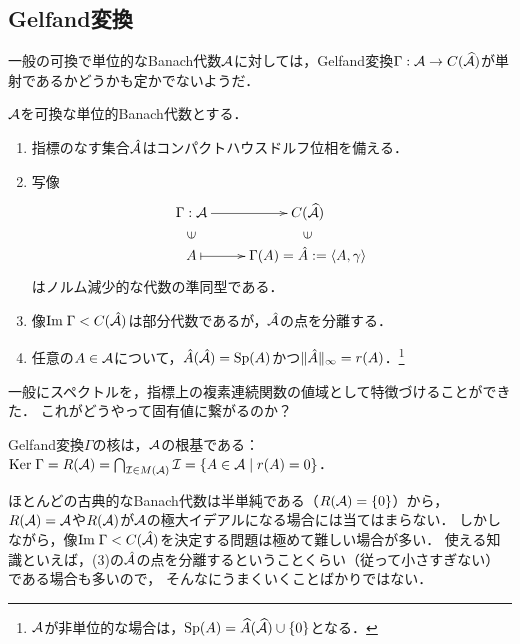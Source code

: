 \documentclass[uplatex,dvipdfmx]{jsreport}
\begin{document}
\subsection{Gelfand変換}

\begin{tcolorbox}[colframe=ForestGreen, colback=ForestGreen!10!white,breakable,colbacktitle=ForestGreen!40!white,coltitle=black,fonttitle=\bfseries\sffamily,
title=]
    一般の可換で単位的なBanach代数$\mathcal{A}$に対しては，Gelfand変換$\Gamma:\mathcal{A}\to C(\widehat{\mathcal{A}})$が単射であるかどうかも定かでないようだ．
\end{tcolorbox}

\begin{theorem}\label{thm-Gelfand}
    $\mathcal{A}$を可換な単位的Banach代数とする．
    \begin{enumerate}
        \item 指標のなす集合$\hat{\mathcal{A}}$はコンパクトハウスドルフ位相を備える．
        \item 写像
        \[\xymatrix@R-2pc{
            \Gamma:\A\ar[r]&C(\wh{\A})\\
            \rotatebox[origin=c]{90}{$\in$}&\rotatebox[origin=c]{90}{$\in$}\\
            A\ar@{|->}[r]&\Gamma(A)=\hat{A}:=\brac{A,\gamma}
        }\]
        はノルム減少的な代数の準同型である．
        \item 像$\mathrm{Im}\;\Gamma<C(\hat{\mathcal{A}})$は部分代数であるが，$\hat{\mathcal{A}}$の点を分離する．
        \item 任意の$A\in\mathcal{A}$について，$\hat{A}(\hat{\mathcal{A}})=\mathrm{Sp}(A)$かつ$\|\hat{A}\|_\infty=r(A)$．\footnote{$\mathcal{A}$が非単位的な場合は，$\mathrm{Sp}(A)=\widehat{A}(\widehat{\mathcal{A}})\cup\{0\}$となる．}
    \end{enumerate}
\end{theorem}
\begin{remarks}
    一般にスペクトルを，指標上の複素連続関数の値域として特徴づけることができた．
    これがどうやって固有値に繋がるのか？
\end{remarks}

\begin{proposition}[Gelfand変換の核]
    Gelfand変換$\Gamma$の核は，$\mathcal{A}$の根基である：
    $\mathrm{Ker}\;\Gamma=R(\mathcal{A})=\bigcap_{\mathcal{I}\in M(\mathcal{A})}\mathcal{I}=\left\{A\in\mathcal{A}\mid r(A)=0\right\}$．
\end{proposition}
\begin{remark}[semisimple]
    ほとんどの古典的なBanach代数は半単純である（$R(\mathcal{A})=\{0\}$）から，
    $R(\mathcal{A})=\mathcal{A}$や$R(\mathcal{A})$が$\mathcal{A}$の極大イデアルになる場合には当てはまらない．
    しかしながら，像$\mathrm{Im}\;\Gamma<C(\hat{\mathcal{A}})$を決定する問題は極めて難しい場合が多い．
    使える知識といえば，(3)の$\hat{\mathcal{A}}$の点を分離するということくらい（従って小さすぎない）である場合も多いので，
    そんなにうまくいくことばかりではない．
\end{remark}
\end{document}
